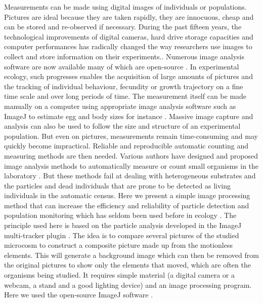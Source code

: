 Measurements can be made using digital images of individuals or populations.
Pictures are ideal because they are taken rapidly, they are innocuous, cheap and
can be stored and re-observed if necessary. During the past fifteen years, the
technological improvements of digital cameras, hard drive storage capacities and
computer performances \autocite{walter2005a} has radically changed the way
researchers use images to collect and store information on their experiments..
Numerous image analysis software are now available \autocite{eliceiri2012a} many of which
are open-source \autocite{schneider2012a}. In experimental ecology, such progresses
enables the acquisition of large amounts of pictures and the tracking of individual behaviour, fecundity or growth
trajectory on a fine time scale and over long periods of time. The measurement
itself can be made manually on a computer using appropriate image analysis
software such as ImageJ \autocite{schneider2012a,abramoff2004a} to estimate egg
and body sizes for instance \autocite{tully2008a,plaistow2009a}. Massive image
capture and analysis can also be used to follow the size and structure of an experimental population. But even on pictures, measurements
remain time-consuming and may quickly become impractical. Reliable and
reproducible automatic counting and measuring methods are then needed.
Various authors have designed and proposed image analysis methods to
automatically measure or count small organisms in the laboratory
\autocite{hooper2006a,krogh1998a,auclerc2010a,lukas2009a,marcal2006a}.
But these methods fail at dealing with heterogeneous substrates and the particles
and dead individuals that are prone to be detected as living individuals in the
automatic census. Here we present a simple image processing method that can
increase the efficiency and reliability of particle detection and population
monitoring which has seldom been used before in ecology
\autocite{faerovig2002a,mallard2012a}.
The principle used here is based on the particle analysis developed in the ImageJ
multi-tracker plugin \autocite{kuhn2001a}. The idea is to compare several pictures
of the studied microcosm to construct a composite picture made  up from the motionless
elements. This will generate a background image which can then be removed from
the original pictures to show only the elements that moved, which are often the
organisms being studied. It requires simple material (a digital camera or a
webcam, a stand and a good lighting device) and an image processing program.
Here we used the open-source ImageJ software \autocite{abramoff2004a}.

